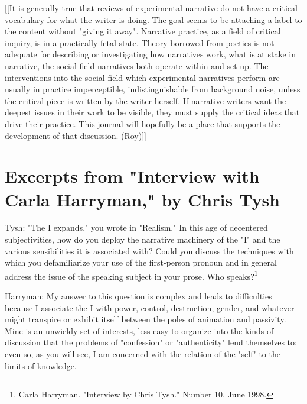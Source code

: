 \documentclass[
]{memoir}
\begin{document}
{[}{[}It is generally true that reviews of experimental narrative do not
have a critical vocabulary for what the writer is doing. The goal seems
to be attaching a label to the content without "giving it away".
Narrative practice, as a field of critical inquiry, is in a practically
fetal state. Theory borrowed from poetics is not adequate for describing
or investigating how narratives work, what is at stake in narrative, the
social field narratives both operate within and set up. The
interventions into the social field which experimental narratives
perform are usually in practice imperceptible, indistinguishable from
background noise, unless the critical piece is written by the writer
herself. If narrative writers want the deepest issues in their work to
be visible, they must supply the critical ideas that drive their
practice. This journal will hopefully be a place that supports the
development of that discussion. (Roy){]}{]}

\hypertarget{excerpts-from-interview-with-carla-harryman-by-chris-tysh}{%
\section*{Excerpts from "Interview with Carla Harryman," by Chris
Tysh}\label{excerpts-from-interview-with-carla-harryman-by-chris-tysh}}

Tysh: "The I expands," you wrote in "Realism." In this age of decentered
subjectivities, how do you deploy the narrative machinery of the "I" and
the various sensibilities it is associated with? Could you discuss the
techniques with which you defamiliarize your use of the first-person
pronoun and in general address the issue of the speaking subject in your
prose. Who speaks?\footnote{Carla Harryman. "Interview by Chris Tysh."
  Number 10, June 1998.}

Harryman: My answer to this question is complex and leads to
difficulties because I associate the I with power, control, destruction,
gender, and whatever might transpire or exhibit itself between the poles
of animation and passivity. Mine is an unwieldy set of interests, less
easy to organize into the kinds of discussion that the problems of
"confession" or "authenticity" lend themselves to; even so, as you will
see, I am concerned with the relation of the "self" to the limits of
knowledge.
\end{document}
